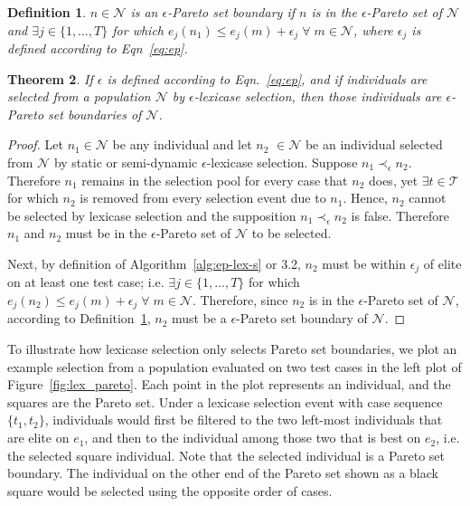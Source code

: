 \documentclass[twoside]{article}
\newtheorem{lex}{Theorem}[section]
\newtheorem{defn}[lex]{Definition}
\begin{document}
\begin{defn}\label{def:eboundary}
$n \in \mathcal{N}$ is an {\it $\epsilon$-Pareto set boundary} if $n$ is in the $\epsilon$-Pareto set of $\mathcal{N}$ and $\exists j \in \{1,\dots,T\}$ for which $e_j(n_1) \leq e_j(m) + \epsilon_j \; \forall \; m \in \mathcal{N}$, where $\epsilon_j$ is defined according to Eqn~\ref{eq:ep}. \bigskip
\end{defn}

\begin{lex}\label{thm:eplex}
If $\epsilon$ is defined according to Eqn.~\ref{eq:ep}, and if individuals are selected from a population $\mathcal{N}$ by $\epsilon$-lexicase selection, then those individuals are $\epsilon$-Pareto set boundaries of $\mathcal{N}$.  
\end{lex}


\begin{proof}
Let $n_1 \in \mathcal{N}$ be any individual and let $n_2$ $\in \mathcal{N}$ be an individual selected from $\mathcal{N}$ by static or semi-dynamic $\epsilon$-lexicase selection. Suppose $n_1 \prec_{\epsilon} n_2$. Therefore $n_1$ remains in the selection pool for every case that $n_2$ does, yet $\exists t \in \mathcal{T}$ for which $n_2$ is removed from every selection event due to $n_1$. Hence, $n_2$ cannot be selected by lexicase selection and the supposition $n_1 \prec_{\epsilon} n_2$ is false.  Therefore $n_1$ and $n_2$ must be in the $\epsilon$-Pareto set of $\mathcal{N}$ to be selected. 

Next, by definition of Algorithm~\ref{alg:ep-lex-s} or 3.2, $n_2$ must be within $\epsilon_j$ of elite on at least one test case; i.e. $\exists j \in \{1,\dots,T\}$ for which $e_j(n_2) \leq e_j(m) + \epsilon_j \; \forall \; m \in \mathcal{N}$. Therefore, since $n_2$ is in the $\epsilon$-Pareto set of $\mathcal{N}$, according to Definition~\ref{def:eboundary}, $n_2$ must be a $\epsilon$-Pareto set boundary of $\mathcal{N}$.  
\end{proof}
\bigskip

To illustrate how lexicase selection only selects Pareto set boundaries, we plot an example selection from a population evaluated on two test cases in the left plot of Figure~\ref{fig:lex_pareto}. Each point in the plot represents an individual, and the squares are the Pareto set. Under a lexicase selection event with case sequence $\{t_1, t_2\}$, individuals would first be filtered to the two left-most individuals that are elite on $e_1$, and then to the individual among those two that is best on $e_2$, i.e. the selected square individual. Note that the selected individual is a Pareto set boundary. The individual on the other end of the Pareto set shown as a black square would be selected using the opposite order of cases.  
\end{document}
